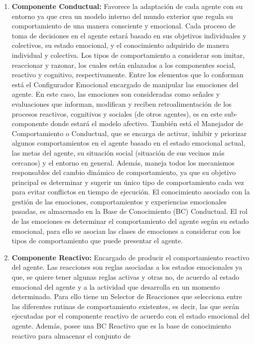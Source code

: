 \begin{enumerate}
\item \textbf{Componente Conductual:} Favorece la adaptación de cada agente con su
entorno ya que crea un modelo interno del mundo exterior que regula su
comportamiento de una manera consciente y emocional. Cada proceso de toma de
decisiones en el agente estará basado en sus objetivos individuales y
colectivos, su estado emocional, y el conocimiento adquirido de manera
individual y colectiva. Los tipos de comportamiento a considerar son imitar,
reaccionar y razonar, los cuales están enlazados a los componentes social,
reactivo y cognitivo, respectivamente. Entre los elementos que lo conforman está
el Configurador Emocional encargado de manipular las emociones del agente. En
este caso, las emociones son consideradas como señales y evaluaciones que
informan, modifican y reciben retroalimentación de los procesos reactivos,
cognitivos y sociales (de otros agentes), es en este sub-componente donde estará
el modelo afectivo. También está el Manejador de Comportamiento o Conductual,
que se encarga de activar, inhibir y priorizar algunos comportamientos en el
agente basado en el estado emocional actual, las metas del agente, su situación
social (situación de sus vecinos más cercanos) y el entorno en general. Además,
maneja todos los mecanismos responsables del cambio dinámico de comportamiento,
ya que su objetivo principal es determinar y sugerir un único tipo de
comportamiento cada vez para evitar conflictos en tiempo de ejecución. El
conocimiento asociado con la gestión de las emociones, comportamientos y
experiencias emocionales pasadas, es almacenado en la Base de Conocimiento (BC)
Conductual. El rol de las emociones es determinar el comportamiento del agente
según su estado emocional, para ello se asocian las clases de emociones a
considerar con los tipos de comportamiento que puede presentar el agente.
\item \textbf{Componente Reactivo:} Encargado de producir el comportamiento reactivo del
agente. Las reacciones son reglas asociadas a los estados emocionales ya que, se
quiere tener algunas reglas activas y otras no, de acuerdo al estado emocional
del agente y a la actividad que desarrolla en un momento determinado. Para ello
tiene un Selector de Reacciones que selecciona entre las diferentes rutinas de
comportamiento existentes, es decir, las que serán ejecutadas por el componente
reactivo de acuerdo con el estado emocional del agente. Además, posee una BC
Reactivo que es la base de conocimiento reactivo para almacenar el conjunto de

\end{enumerate}
